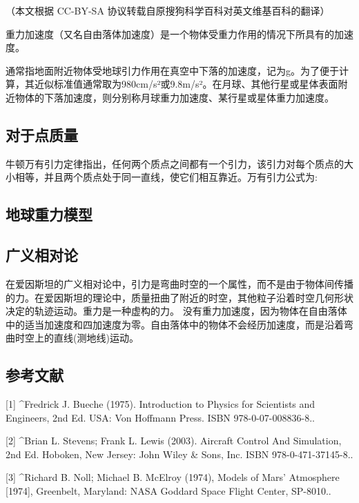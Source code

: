
（本文根据 CC-BY-SA 协议转载自原搜狗科学百科对英文维基百科的翻译）


重力加速度（又名自由落体加速度）是一个物体受重力作用的情况下所具有的加速度。

通常指地面附近物体受地球引力作用在真空中下落的加速度，记为g。为了便于计算，其近似标准值通常取为980cm/s²或9.8m/s²。在月球、其他行星或星体表面附近物体的下落加速度，则分别称月球重力加速度、某行星或星体重力加速度。

\subsection{对于点质量}

牛顿万有引力定律指出，任何两个质点之间都有一个引力，该引力对每个质点的大小相等，并且两个质点处于同一直线，使它们相互靠近。万有引力公式为:




\subsection{地球重力模型}



\subsection{广义相对论}

在爱因斯坦的广义相对论中，引力是弯曲时空的一个属性，而不是由于物体间传播的力。在爱因斯坦的理论中，质量扭曲了附近的时空，其他粒子沿着时空几何形状决定的轨迹运动。重力是一种虚构的力。 没有重力加速度，因为物体在自由落体中的适当加速度和四加速度为零。自由落体中的物体不会经历加速度，而是沿着弯曲时空上的直线(测地线)运动。

\subsection{参考文献}

[1]
^Fredrick J. Bueche (1975). Introduction to Physics for Scientists and Engineers, 2nd Ed. USA: Von Hoffmann Press. ISBN 978-0-07-008836-8..

[2]
^Brian L. Stevens; Frank L. Lewis (2003). Aircraft Control And Simulation, 2nd Ed. Hoboken, New Jersey: John Wiley & Sons, Inc. ISBN 978-0-471-37145-8..

[3]
^Richard B. Noll; Michael B. McElroy (1974), Models of Mars' Atmosphere [1974], Greenbelt, Maryland: NASA Goddard Space Flight Center, SP-8010..